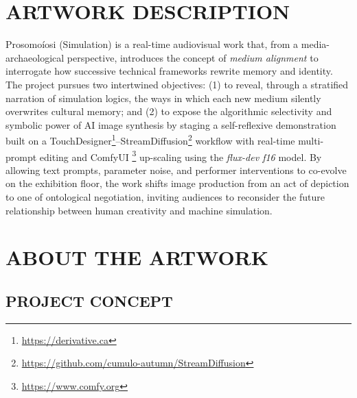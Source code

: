 \documentclass[sigconf]{acmart} %
\begin{document}
\section{ARTWORK DESCRIPTION}
Prosomoíosi (Simulation) is a real-time audiovisual work that, from a media-archaeological perspective, introduces the concept of \emph{medium alignment} to interrogate how successive technical frameworks rewrite memory and identity. The project pursues two intertwined objectives: (1) to reveal, through a stratified narration of simulation logics, the ways in which each new medium silently overwrites cultural memory; and (2) to expose the algorithmic selectivity and symbolic power of AI image synthesis by staging a self-reflexive demonstration built on a TouchDesigner\footnote{\url{https://derivative.ca}}--StreamDiffusion\footnote{\url{https://github.com/cumulo-autumn/StreamDiffusion}} workflow with real-time multi-prompt editing and ComfyUI \footnote{\url{https://www.comfy.org}} up-scaling using the \textit{flux-dev f16} model. By allowing text prompts, parameter noise, and performer interventions to co-evolve on the exhibition floor, the work shifts image production from an act of depiction to one of ontological negotiation, inviting audiences to reconsider the future relationship between human creativity and machine simulation.
\section{ABOUT THE ARTWORK}
\subsection{PROJECT CONCEPT}
\end{document}
